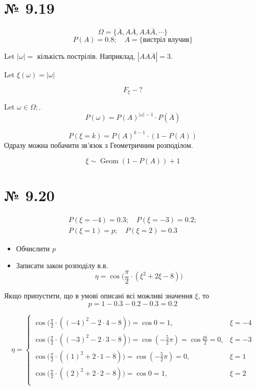 \documentclass[11pt, a4paper]{article} %
\begin{document}

\section*{№ 9.19}
\newcommand{\nA}{\overline{A}}
\begin{mdframed}
    $$\Omega = \{\nA, A\nA, AA\nA, \cdots \}$$
    $$P(A) = 0.8;\quad A = \{\text{вистріл влучив}\}$$
    
    Let $|\omega| = $ кількість пострілів. Наприклад, $|AA\nA| = 3$.

    Let $\xi(\omega) = |\omega|$

    $$F_{\xi} - ?$$
\end{mdframed}

Let $\omega \in \Omega;$. 
$$P(\omega) = P(A)^{|\omega|-1}\cdot P(\nA)$$


$$P(\xi = k) = P(A)^{k-1}\cdot (1-P(A))$$
Одразу можна побачити зв'язок з Геометричним розподілом. 

$$\xi \sim \operatorname{Geom}(1-P(A)) + 1$$ 

\section*{№ 9.20}
\begin{mdframed}
    $$\begin{gathered}
        P(\xi = -4) = 0.3; \quad P(\xi = -3)=0.2;\\
        P(\xi=1)=p; \quad P(\xi=2) = 0.3
    \end{gathered}$$

    \begin{itemize}
        \item Обчислити $p$
        \item Записати закон розподілу в.в.
        $$\eta = \cos \bigl(\frac{\pi}{2} \cdot (\xi^2 + 2\xi -8)\bigr)$$
    \end{itemize}
\end{mdframed}

Якщо припустити, що в умові описані всі можливі значення $\xi$, то 
$$p = 1 - 0.3 - 0.2 - 0.3 = 0.2$$

$$\eta = \begin{cases}
    \cos \bigl(\frac{\pi}{2} \cdot ((-4)^2 - 2\cdot 4 - 8)\bigr) = \cos 0 = 1, & \xi = -4 \\
    \cos \bigl(\frac{\pi}{2} \cdot ((-3)^2 - 2\cdot 3 - 8)\bigr) = \cos (-\frac{5}{2}\pi) = \cos \frac{pi}{2} =  0, & \xi = -3 \\
    \cos \bigl(\frac{\pi}{2} \cdot ((1)^2 + 2\cdot 1 - 8)\bigr) = \cos (-\frac{5}{2}\pi) = 0, & \xi = 1 \\
    \cos \bigl(\frac{\pi}{2} \cdot ((2)^2 + 2\cdot 2 - 8)\bigr) = \cos 0 = 1, & \xi = 2 \\
\end{cases}$$
\end{document}
